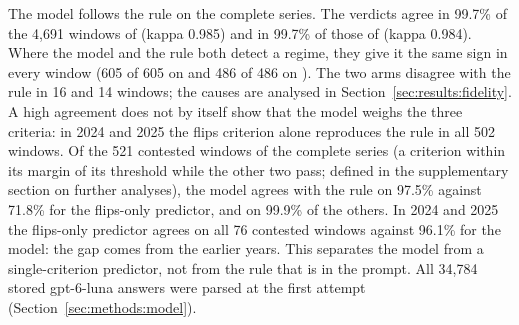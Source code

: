 The model follows the rule on the complete series. The verdicts agree in 99.7\% of the 4{,}691 windows of  (kappa 0.985) and in 99.7\% of those of  (kappa 0.984). Where the model and the rule both detect a regime, they give it the same sign in every window (605 of 605 on  and 486 of 486 on ). The two arms disagree with the rule in 16 and 14 windows; the causes are analysed in Section~\ref{sec:results:fidelity}.
A high agreement does not by itself show that the model weighs the three criteria: in 2024 and 2025 the flips criterion alone reproduces the rule in all 502 windows. Of the 521 contested windows of the complete series (a criterion within its margin of its threshold while the other two pass; defined in the supplementary section on further analyses), the model agrees with the rule on 97.5\% against 71.8\% for the flips-only predictor, and on 99.9\% of the others. In 2024 and 2025 the flips-only predictor agrees on all 76 contested windows against 96.1\% for the model: the gap comes from the earlier years. This separates the model from a single-criterion predictor, not from the rule that is in the prompt. All 34{,}784 stored gpt-6-luna answers were parsed at the first attempt (Section~\ref{sec:methods:model}).

